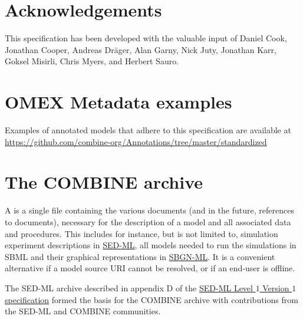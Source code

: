 \documentclass[pdftex,rgb,dvipsnames,svgnames,hyperref,table]{report}
\begin{document}
\chapter{Acknowledgements}
\label{sec:acknowledgments}
\vspace{5mm}

This specification has been developed with the valuable input of Daniel Cook, Jonathan Cooper, Andreas Dräger, Alan Garny, Nick Juty, Jonathan Karr, Goksel Misirli, Chris Myers, and Herbert Sauro.

\appendix

\vspace{5mm}
\vspace{5mm}
\chapter{OMEX Metadata examples}
\vspace{5mm}

Examples of annotated models that adhere to this specification are available at \url{https://github.com/combine-org/Annotations/tree/master/standardized}
\vspace{5mm}
\vspace{5mm}

\chapter{The COMBINE archive}
\label{app:archive}
\vspace{5mm}

A  is a single file containing the various documents (and in the future, references to documents), necessary for the description of a model and all associated data and procedures. This includes for instance, but is not limited to, simulation experiment descriptions in \href{https://sed-ml.org/specifications.html}{SED-ML}, all models needed to run the simulations in SBML and their graphical representations in \href{https://github.com/sbgn/sbgn/wiki/SBGN_ML}{SBGN-ML}. It is a convenient alternative if a model source URI cannot be resolved,  or if an end-user is offline.

The SED-ML archive described in appendix D of the \href{http://co.mbine.org/specifications/sed-ml.level-1.version-1}{SED-ML Level $1$ Version $1$ specification} formed the basis for the COMBINE archive with contributions from the SED-ML and COMBINE communities.
\end{document}
